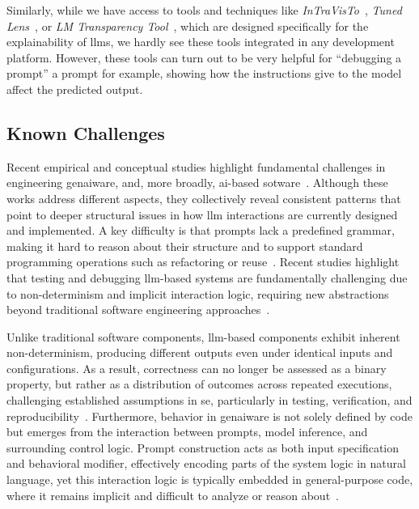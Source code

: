 \documentclass[manuscript,screen]{acmart}
\begin{document}
Similarly, while we have access to tools and techniques like \emph{InTraVisTo}~\cite{DBLP:journals/corr/abs-2507-13858}, \emph{Tuned Lens}~\cite{DBLP:journals/corr/abs-2303-08112}, or \emph{LM Transparency Tool}~\cite{DBLP:journals/corr/abs-2404-07004}, which are designed specifically for the explainability of \acp{llm}, we hardly see these tools integrated in any development platform.
However, these tools can turn out to be very helpful for ``debugging a prompt'' a prompt for example, showing how the instructions give to the model affect the predicted output.

\subsection{Known Challenges}
\label{sec:known-challenges}

Recent empirical and conceptual studies highlight fundamental challenges in engineering \ac{genai}ware, and, more broadly, \ac{ai}-based sotware~\cite{schuler2026architecting}. 
Although these works address different aspects, they collectively reveal consistent patterns that point to deeper structural issues in how \ac{llm} interactions are currently designed and implemented.
A key difficulty is that prompts lack a predefined grammar, making it hard to reason about their structure and to support standard programming operations such as refactoring or reuse~\cite{10.1145/3544549.3585737}.
Recent studies highlight that testing and debugging \ac{llm}-based systems are fundamentally challenging due to non-determinism and implicit interaction logic, requiring new abstractions beyond traditional software engineering approaches~\cite{10.1145/3806396,DBLP:conf/icse-seip/NaharKBPZB25}.

Unlike traditional software components, \ac{llm}-based components exhibit inherent non-determinism, producing different outputs even under identical inputs and configurations.
As a result, correctness can no longer be assessed as a binary property, but rather as a distribution of outcomes across repeated executions, challenging established assumptions in \ac{se}, particularly in testing, verification, and reproducibility~\cite{10.1145/3806396}.
Furthermore, behavior in \ac{genai}ware is not solely defined by code but emerges from the interaction between prompts, model inference, and surrounding control logic.
Prompt construction acts as both input specification and behavioral modifier, effectively encoding parts of the system logic in natural language, yet this interaction logic is typically embedded in general-purpose code, where it remains implicit and difficult to analyze or reason about~\cite{10.1145/3806396}.
\end{document}
